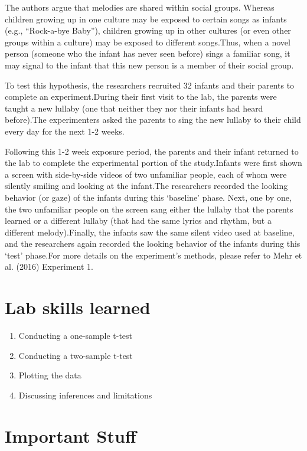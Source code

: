 \documentclass[]{book}
\providecommand{\tightlist}{%
  \setlength{\itemsep}{0pt}\setlength{\parskip}{0pt}}
\theoremstyle{definition}
\theoremstyle{definition}
\theoremstyle{definition}
\theoremstyle{remark}
\begin{document}
The authors argue that melodies are shared within social groups. Whereas
children growing up in one culture may be exposed to certain songs as
infants (e.g., ``Rock-a-bye Baby''), children growing up in other
cultures (or even other groups within a culture) may be exposed to
different songs.Thus, when a novel person (someone who the infant has
never seen before) sings a familiar song, it may signal to the infant
that this new person is a member of their social group.

To test this hypothesis, the researchers recruited 32 infants and their
parents to complete an experiment.During their first visit to the lab,
the parents were taught a new lullaby (one that neither they nor their
infants had heard before).The experimenters asked the parents to sing
the new lullaby to their child every day for the next 1-2 weeks.

Following this 1-2 week exposure period, the parents and their infant
returned to the lab to complete the experimental portion of the
study.Infants were first shown a screen with side-by-side videos of two
unfamiliar people, each of whom were silently smiling and looking at the
infant.The researchers recorded the looking behavior (or gaze) of the
infants during this `baseline' phase. Next, one by one, the two
unfamiliar people on the screen sang either the lullaby that the parents
learned or a different lullaby (that had the same lyrics and rhythm, but
a different melody).Finally, the infants saw the same silent video used
at baseline, and the researchers again recorded the looking behavior of
the infants during this `test' phase.For more details on the
experiment's methods, please refer to Mehr et al. (2016) Experiment 1.

\section{Lab skills learned}\label{lab-skills-learned}

\begin{enumerate}
\def\labelenumi{\arabic{enumi}.}
\tightlist
\item
  Conducting a one-sample t-test
\item
  Conducting a two-sample t-test
\item
  Plotting the data
\item
  Discussing inferences and limitations
\end{enumerate}

\section{Important Stuff}\label{important-stuff}
\end{document}
